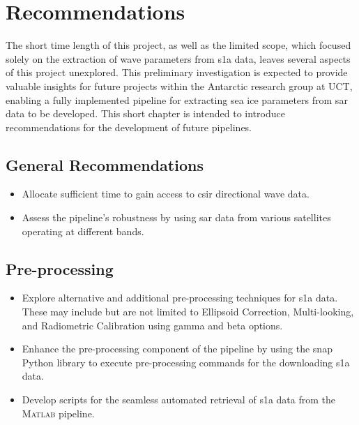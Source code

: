 \chapter{Recommendations}
\label{chap:recommendations}
The short time length of this project, as well as the limited scope, which focused solely on the extraction of wave parameters from \acs{s1a} data, leaves several aspects of this project unexplored. This preliminary investigation is expected to provide valuable insights for future projects within the Antarctic research group at UCT, enabling a fully implemented pipeline for extracting sea ice parameters from \acs{sar} data to be developed. This short chapter is intended to introduce recommendations for the development of future pipelines.

\section{General Recommendations} \label{sec:rec.general}
\begin{itemize}
    \item Allocate sufficient time to gain access to \acs{csir} directional wave data.
    \item Assess the pipeline's robustness by using \acs{sar} data from various satellites operating at different bands. 
\end{itemize}

\section{Pre-processing} \label{sec:rec.preProcess}

\begin{itemize}
    \item Explore alternative and additional pre-processing techniques for \acs{s1a} data. These may include but are not limited to Ellipsoid Correction, Multi-looking, and Radiometric Calibration using gamma and beta options.
    \item Enhance the pre-processing component of the pipeline by using the \acs{snap} Python library to execute pre-processing commands for the downloading \acs{s1a} data.    
    \item Develop scripts for the seamless automated retrieval of \acs{s1a} data from the \textsc{Matlab} pipeline.
\end{itemize}

